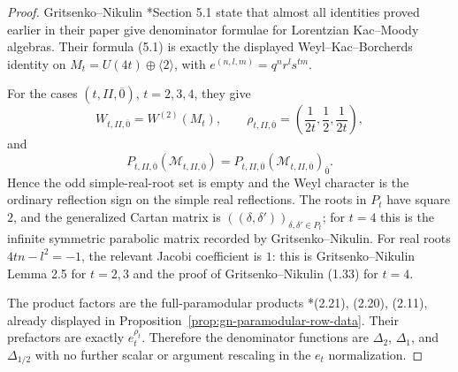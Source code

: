 \documentclass[11pt]{memoir}
\begin{document}
\begin{proof}
Gritsenko--Nikulin \cite{GNII}*{Section 5.1} state that almost all
identities proved earlier in their paper give denominator formulae for
Lorentzian Kac--Moody algebras.  Their formula (5.1) is exactly the
displayed Weyl--Kac--Borcherds identity on
$M_t=U(4t)\oplus\langle2\rangle$, with
$e^{(n,l,m)}=q^nr^ls^{tm}$.

For the cases $(t,II,\overline0)$, $t=2,3,4$, they give
$$
W_{t,II,\overline0}=W^{(2)}(M_t),\qquad
\rho_{t,II,\overline0}
=\left(\frac{1}{2t},\frac12,\frac{1}{2t}\right),
$$
and
$$
P_{t,II,\overline0}(\mathcal M_{t,II,\overline0})
=P_{t,II,\overline0}(\mathcal M_{t,II,\overline0})_{\overline0}.
$$
Hence the odd simple-real-root set is empty and the Weyl character is
the ordinary reflection sign on the simple real reflections.  The roots
in $P_t$ have square $2$, and the generalized Cartan matrix is
$((\delta,\delta'))_{\delta,\delta'\in P_t}$; for $t=4$ this is the
infinite symmetric parabolic matrix recorded by Gritsenko--Nikulin.
For real roots \(4tn-l^2=-1\), the relevant Jacobi coefficient is \(1\):
this is Gritsenko--Nikulin Lemma 2.5 for \(t=2,3\) and the proof of
Gritsenko--Nikulin (1.33) for \(t=4\).

The product factors are the full-paramodular products
\cite{GNII}*{(2.21), (2.20), (2.11)}, already displayed in
Proposition~\ref{prop:gn-paramodular-row-data}.  Their prefactors are
exactly $e_t^{\rho_t}$.  Therefore the denominator functions are
$\Delta_2$, $\Delta_1$, and $\Delta_{1/2}$ with no further scalar or
argument rescaling in the $e_t$ normalization.
\end{proof}
\end{document}
